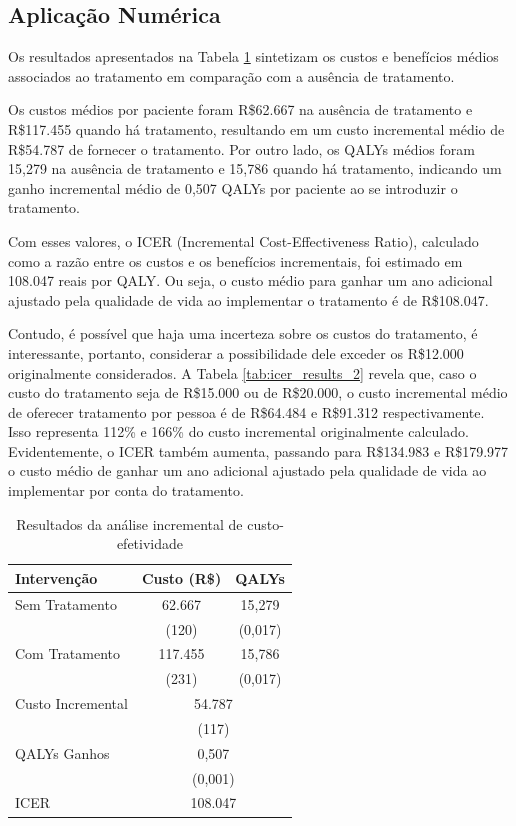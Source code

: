 \documentclass[12pt, a4paper, openany]{book}
\numberwithin{equation}{chapter}
\numberwithin{table}{chapter}
\numberwithin{figure}{chapter}
\theoremstyle{break}
\begin{document}
\subsection{Aplicação Numérica}

Os resultados apresentados na Tabela \ref{tab:icer_results} sintetizam os custos e benefícios médios associados ao tratamento em comparação com a ausência de tratamento. 

Os custos médios por paciente foram R\$62.667 na ausência de tratamento e R\$117.455 quando há tratamento, resultando em um custo incremental médio de R\$54.787 de fornecer o tratamento. Por outro lado, os QALYs médios foram 15,279 na ausência de tratamento e 15,786 quando há tratamento, indicando um ganho incremental médio de 0,507 QALYs por paciente ao se introduzir o tratamento.

Com esses valores, o ICER (Incremental Cost-Effectiveness Ratio), calculado como a razão entre os custos e os benefícios incrementais, foi estimado em 108.047 reais por QALY. Ou seja, o custo médio para ganhar um ano adicional ajustado pela qualidade de vida ao implementar o tratamento é de R\$108.047.

Contudo, é possível que haja uma incerteza sobre os custos do tratamento, é interessante, portanto, considerar a possibilidade dele exceder os R\$12.000 originalmente considerados. A Tabela \ref{tab:icer_results_2} revela que, caso o custo do tratamento seja de R\$15.000 ou de R\$20.000, o custo incremental médio de oferecer tratamento por pessoa é de R\$64.484 e R\$91.312 respectivamente. Isso representa 112\% e 166\% do custo incremental originalmente calculado. Evidentemente, o ICER também aumenta, passando para R\$134.983 e R\$179.977 o custo médio de ganhar um ano adicional ajustado pela qualidade de vida ao implementar por conta do tratamento.

\begin{table}[H] 
\centering 
\renewcommand{\arraystretch}{1.5}
\caption{Resultados da análise incremental de custo-efetividade}
\label{tab:icer_results}
\begin{tabular}{lcc} 
\hline 
\hline 
Intervenção & Custo (R\$) & QALYs \\ 
\hline 
Sem Tratamento & 62.667 & 15,279 \\ 
               & (120)   & (0,017) \\ 
Com Tratamento & 117.455 & 15,786 \\ 
               & (231)   & (0,017) \\ 
\hline 
Custo Incremental & \multicolumn{2}{c}{54.787} \\ 
                  & \multicolumn{2}{c}{(117)} \\ 
QALYs Ganhos      & \multicolumn{2}{c}{0,507} \\ 
                  & \multicolumn{2}{c}{(0,001)} \\ 
ICER              & \multicolumn{2}{c}{108.047} \\ 
\hline 
\hline 
\end{tabular} 
\end{table}
\end{document}

